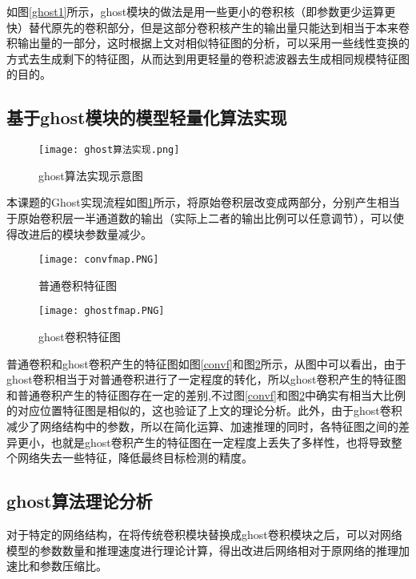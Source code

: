 如图\ref{ghost1}所示，ghost模块的做法是用一些更小的卷积核（即参数更少运算更快）替代原先的卷积部分，但是这部分卷积核产生的输出量只能达到相当于本来卷积输出量的一部分，这时根据上文对相似特征图的分析，可以采用一些线性变换的方式去生成剩下的特征图，从而达到用更轻量的卷积滤波器去生成相同规模特征图的目的。

\subsection{基于ghost模块的模型轻量化算法实现}

\begin{figure}[htbp]
    \centering
    \texttt{[image: ghost算法实现.png]}
    \caption{ghost算法实现示意图}
    \label{ghost2}
\end{figure}

本课题的Ghost实现流程如图\ref{ghost2}所示，将原始卷积层改变成两部分，分别产生相当于原始卷积层一半通道数的输出（实际上二者的输出比例可以任意调节），可以使得改进后的模块参数量减少。

\begin{figure}[htbp]
	\centering
	\begin{minipage}{0.49\linewidth}
		\centering
		\texttt{[image: convfmap.PNG]}
		\caption{普通卷积特征图}
		\label{convf}%
	\end{minipage}
	\begin{minipage}{0.49\linewidth}
		\centering
		\texttt{[image: ghostfmap.PNG]}
		\caption{ghost卷积特征图}
		\label{ghostf}%
	\end{minipage}
\end{figure}

普通卷积和ghost卷积产生的特征图如图\ref{convf}和图\ref{ghostf}所示，从图中可以看出，由于ghost卷积相当于对普通卷积进行了一定程度的转化，所以ghost卷积产生的特征图和普通卷积产生的特征图存在一定的差别,不过图\ref{convf}和图\ref{ghostf}中确实有相当大比例的对应位置特征图是相似的，这也验证了上文的理论分析。此外，由于ghost卷积减少了网络结构中的参数，所以在简化运算、加速推理的同时，各特征图之间的差异更小，也就是ghost卷积产生的特征图在一定程度上丢失了多样性，也将导致整个网络失去一些特征，降低最终目标检测的精度。

\subsection{ghost算法理论分析}
对于特定的网络结构，在将传统卷积模块替换成ghost卷积模块之后，可以对网络模型的参数数量和推理速度进行理论计算，得出改进后网络相对于原网络的推理加速比和参数压缩比。

